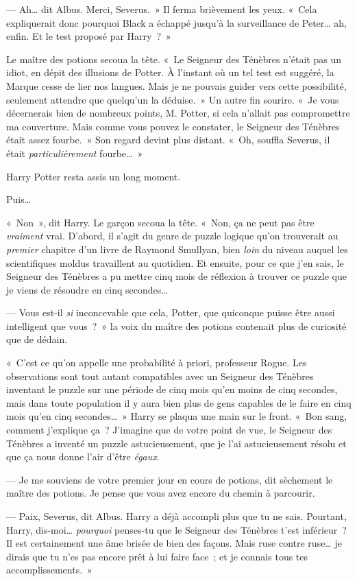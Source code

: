 --- Ah… dit Albus. Merci, Severus.~» Il ferma brièvement les yeux. «~Cela expliquerait donc pourquoi Black a échappé jusqu'à la surveillance de Peter… ah, enfin. Et le test proposé par Harry~?~»

Le maître des potions secoua la tête. «~Le Seigneur des Ténèbres n'était pas un idiot, en dépit des illusions de Potter. À l'instant où un tel test est suggéré, la Marque cesse de lier nos langues. Mais je ne pouvais guider vers cette possibilité, seulement attendre que quelqu'un la déduise.~» Un autre fin sourire. «~Je vous décernerais bien de nombreux points, M. Potter, si cela n'allait pas compromettre ma couverture. Mais comme vous pouvez le constater, le Seigneur des Ténèbres était assez fourbe.~» Son regard devint plus distant. «~Oh, souffla Severus, il était \emph{particulièrement} fourbe…~»

Harry Potter resta assis un long moment.

Puis…

«~Non~», dit Harry. Le garçon secoua la tête. «~Non, ça ne peut pas être \emph{vraiment} vrai. D'abord, il s'agit du genre de puzzle logique qu'on trouverait au \emph{premier} chapitre d'un livre de Raymond Smullyan, bien \emph{loin} du niveau auquel les scientifiques moldus travaillent au quotidien. Et ensuite, pour ce que j'en sais, le Seigneur des Ténèbres a pu mettre cinq mois de réflexion à trouver ce puzzle que je viens de résoudre en cinq secondes…

--- Vous est-il \emph{si} inconcevable que cela, Potter, que quiconque puisse être aussi intelligent que vous~?~» la voix du maître des potions contenait plus de curiosité que de dédain.

«~C'est ce qu'on appelle une probabilité à priori, professeur Rogue. Les observations sont tout autant compatibles avec un Seigneur des Ténèbres inventant le puzzle sur une période de cinq mois qu'en moins de cinq secondes, mais dans toute population il y aura bien plus de gens capables de le faire en cinq mois qu'en cinq secondes…~» Harry se plaqua une main sur le front. «~Bon sang, comment j'explique ça~? J'imagine que de votre point de vue, le Seigneur des Ténèbres a inventé un puzzle astucieusement, que je l'ai astucieusement résolu et que ça nous donne l'air d'être \emph{égaux}.

--- Je me souviens de votre premier jour en cours de potions, dit sèchement le maître des potions. Je pense que vous avez encore du chemin à parcourir.

--- Paix, Severus, dit Albus. Harry a déjà accompli plus que tu ne sais. Pourtant, Harry, dis-moi… \emph{pourquoi} penses-tu que le Seigneur des Ténèbres t'est inférieur~? Il est certainement une âme brisée de bien des façons. Mais ruse contre ruse… je dirais que tu n'es pas encore prêt à lui faire face~; et je connais tous tes accomplissements.~»

